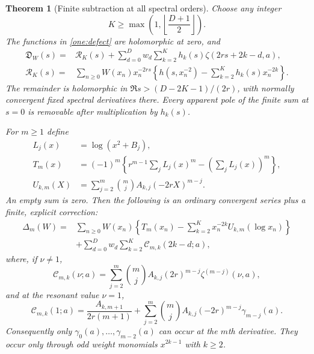 \documentclass[11pt,a4paper]{article}
\numberwithin{equation}{section}
\theoremstyle{plain}
\newtheorem{theorem}{Theorem}[section]
\theoremstyle{definition}
\theoremstyle{remark}
\begin{document}
\begin{theorem}[Finite subtraction at all spectral orders]
\label{thm:alljets}
Choose any integer
\begin{equation}\label{one:K}
 K\ge\max\left(1,\left\lfloor\frac{D+1}{2}\right\rfloor\right).
\end{equation}
The functions in \eqref{one:defect} are holomorphic at zero, and
\begin{align}\label{one:master}
 \mathfrak D_W(s)={}&\mathcal R_K(s)
   +\sum_{d=0}^{D}w_d\sum_{k=2}^{K}
                     h_k(s)\zeta(2rs+2k-d,a),\\
 \mathcal R_K(s)={}&\sum_{n\ge0}W(x_n)x_n^{-2rs}
       \left\{h(s,x_n^{-2})-\sum_{k=2}^{K}h_k(s)x_n^{-2k}\right\}.
       \label{one:remainder}
\end{align}
The remainder is holomorphic in
$\Re s>(D-2K-1)/(2r)$, with normally convergent fixed spectral
derivatives there.  Every apparent pole of the finite sum at $s=0$
is removable after multiplication by $h_k(s)$.

For $m\ge1$ define
\begin{align}
 L_j(x)&=\log(x^2+B_j),\\
 T_m(x)&=(-1)^m\left\{r^{m-1}\sum_j L_j(x)^m
                         -\left(\sum_jL_j(x)\right)^m\right\},
                         \label{one:T}\\
 U_{k,m}(X)&=\sum_{j=2}^{m}\binom mj A_{k,j}(-2rX)^{m-j}.
                         \label{one:U}
\end{align}
An empty sum is zero.  Then the following is an ordinary convergent
series plus a finite, explicit correction:
\begin{equation}\label{one:jet}
 \boxed{\begin{aligned}
 \Delta_m(W)={}&\sum_{n\ge0}W(x_n)
       \left\{T_m(x_n)-\sum_{k=2}^{K}x_n^{-2k}
                                      U_{k,m}(\log x_n)\right\}\\
 &+\sum_{d=0}^{D}w_d\sum_{k=2}^{K}\mathcal C_{m,k}(2k-d;a),
 \end{aligned}}
\end{equation}
where, if $\nu\ne1$,
\begin{equation}\label{one:regularC}
 \mathcal C_{m,k}(\nu;a)=
       \sum_{j=2}^{m}\binom mj A_{k,j}(2r)^{m-j}
                                     \zeta^{(m-j)}(\nu,a),
\end{equation}
and at the resonant value $\nu=1$,
\begin{equation}\label{one:resonantC}
 \boxed{\displaystyle
 \mathcal C_{m,k}(1;a)=\frac{A_{k,m+1}}{2r(m+1)}
       +\sum_{j=2}^{m}\binom mj A_{k,j}(-2r)^{m-j}
                                     \gamma_{m-j}(a).}
\end{equation}
Consequently only $\gamma_0(a),\ldots,\gamma_{m-2}(a)$ can occur at
the $m$th derivative.  They occur only through odd weight monomials
$x^{2k-1}$ with $k\ge2$.
\end{theorem}
\end{document}
